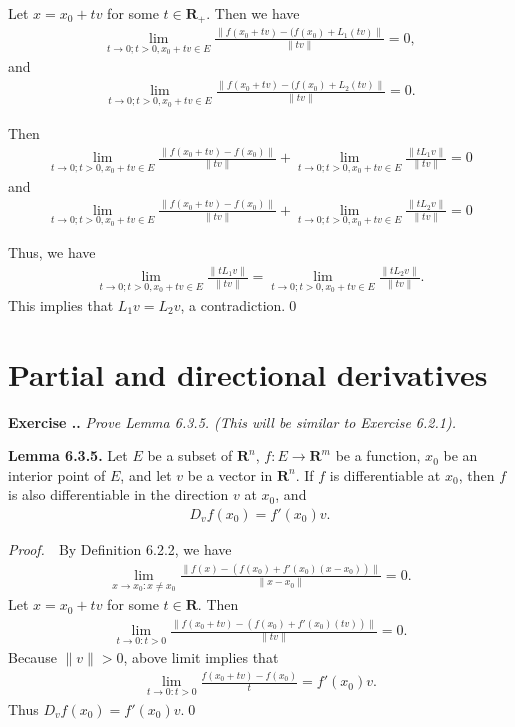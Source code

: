 \documentclass{book}
\newcommand{\pff}{\vspace{.25em}\noindent\emph{Proof.}~~}
\newcommand{\titl}[1]{\noindent\textbf{#1}}
\newcounter{Exercise}[section]
\renewcommand{\theExercise}{\thesection.\arabic{Exercise}.}
\newcommand{\new}{\vspace{1.5em}\noindent\textbf{Exercise \stepcounter{Exercise}\textbf{\theExercise}} }
\begin{document}
Let $x=x_0+tv$ for some $t\in\mathbf{R}_+$. Then we have
    \begin{align*}
        \lim_{t\to 0;t>0,x_0+tv\in E}\frac{\|f(x_0+tv)-(f(x_0)+L_1(tv)\|}{\|tv\|}=0,
    \end{align*}
and
    \begin{align*}
        \lim_{t\to 0;t>0,x_0+tv\in E}\frac{\|f(x_0+tv)-(f(x_0)+L_2(tv)\|}{\|tv\|}=0.
    \end{align*}

Then
    \begin{align*}
        \lim_{t\to 0;t>0,x_0+tv\in E}\frac{\|f(x_0+tv)-f(x_0)\|}{\|tv\|}+\lim_{t\to 0;t>0,x_0+tv\in E}\frac{\|tL_1v\|}{\|tv\|}=0
    \end{align*}
and
    \begin{align*}
        \lim_{t\to 0;t>0,x_0+tv\in E}\frac{\|f(x_0+tv)-f(x_0)\|}{\|tv\|}+\lim_{t\to 0;t>0,x_0+tv\in E}\frac{\|tL_2v\|}{\|tv\|}=0
    \end{align*}

Thus, we have
    \begin{align*}
        \lim_{t\to 0;t>0,x_0+tv\in E}\frac{\|tL_1v\|}{\|tv\|}=\lim_{t\to 0;t>0,x_0+tv\in E}\frac{\|tL_2v\|}{\|tv\|}.
    \end{align*}
This implies that $L_1v=L_2v$, a contradiction.\qed

\section{Partial and directional derivatives}

\new\emph{Prove Lemma 6.3.5. (This will be similar to Exercise 6.2.1).}

\begin{framed}
\titl{Lemma 6.3.5.} Let $E$ be a subset of $\mathbf{R}^n$, $f:E\to\mathbf{R}^m$ be a function, $x_0$ be an interior point of $E$, and let $v$ be a vector in $\mathbf{R}^n$. If $f$ is differentiable at $x_0$, then $f$ is also differentiable in the direction $v$ at $x_0$, and
    \begin{align*}
        D_vf(x_0)=f'(x_0)v.
    \end{align*}
\end{framed}

\pff By Definition 6.2.2, we have
    \begin{align*}
        \lim_{x\to x_0:x\neq x_0}\frac{\|f(x)-(f(x_0)+f'(x_0)(x-x_0))\|}{\|x-x_0\|}=0.
    \end{align*}
Let $x=x_0+tv$ for some $t\in\mathbf{R}$. Then
    \begin{align*}
        \lim_{t\to 0:t>0}\frac{\|f(x_0+tv)-(f(x_0)+f'(x_0)(tv))\|}{\|tv\|}=0.
    \end{align*}
Because $\|v\|>0$, above limit implies that
    \begin{align*}
        \lim_{t\to 0:t>0}\frac{f(x_0+tv)-f(x_0)}{t}=f'(x_0)v.
    \end{align*}
Thus $D_vf(x_0)=f'(x_0)v$.\qed
\end{document}
